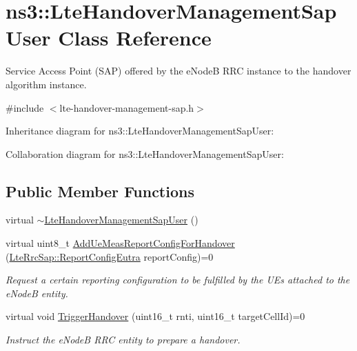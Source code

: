 \hypertarget{classns3_1_1LteHandoverManagementSapUser}{}\section{ns3\+:\+:Lte\+Handover\+Management\+Sap\+User Class Reference}
\label{classns3_1_1LteHandoverManagementSapUser}


Service Access Point (S\+AP) offered by the e\+NodeB R\+RC instance to the handover algorithm instance.  




{\ttfamily \#include $<$lte-\/handover-\/management-\/sap.\+h$>$}



Inheritance diagram for ns3\+:\+:Lte\+Handover\+Management\+Sap\+User\+:


Collaboration diagram for ns3\+:\+:Lte\+Handover\+Management\+Sap\+User\+:
\subsection*{Public Member Functions}
\begin{DoxyCompactItemize}
\item 
virtual \hyperlink{classns3_1_1LteHandoverManagementSapUser_a56dd3652bf5ba7a8606daece727c4cee}{$\sim$\+Lte\+Handover\+Management\+Sap\+User} ()
\item 
virtual uint8\+\_\+t \hyperlink{classns3_1_1LteHandoverManagementSapUser_a80f34ec0e586b42547210c1741b4f980}{Add\+Ue\+Meas\+Report\+Config\+For\+Handover} (\hyperlink{structns3_1_1LteRrcSap_1_1ReportConfigEutra}{Lte\+Rrc\+Sap\+::\+Report\+Config\+Eutra} report\+Config)=0
\begin{DoxyCompactList}\small\item\em Request a certain reporting configuration to be fulfilled by the U\+Es attached to the e\+NodeB entity. \end{DoxyCompactList}\item 
virtual void \hyperlink{classns3_1_1LteHandoverManagementSapUser_aade75e474e4f748ce9ef2e12101c5c42}{Trigger\+Handover} (uint16\+\_\+t rnti, uint16\+\_\+t target\+Cell\+Id)=0
\begin{DoxyCompactList}\small\item\em Instruct the e\+NodeB R\+RC entity to prepare a handover. \end{DoxyCompactList}\end{DoxyCompactItemize}


